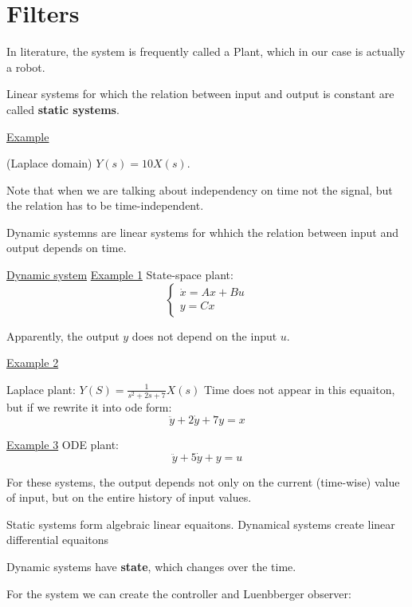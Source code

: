 \section{Filters}

In literature, the system is frequently called a Plant, which in our case is actually a robot. 


\begin{tcolorbox}[colback=green!10,colframe=green!50!black,title=\textbf{Static system}]
    Linear systems for which the relation between input and output is constant are called \textbf{static systems}.
\end{tcolorbox}


\underline{Example}

(Laplace domain) $Y(s) = 10X(s)$. 

Note that when we are talking about independency on time not the signal, but the relation has to be time-independent. 


\begin{tcolorbox}[colback=green!10,colframe=green!50!black,title=\textbf{Dynamic system}]
    Dynamic systemns are linear systems for whhich the relation between input and output depends on time. 
\end{tcolorbox}

\underline{Dynamic system} 
\underline{Example 1}
State-space plant:
\[
\begin{cases}
    \dot x = Ax + Bu \\
    y = Cx 
\end{cases}    
\]

Apparently, the output $y$ does not depend on the input $u$. 

\underline{Example 2}

Laplace plant:
$Y(S) = \frac{1}{s^2 + 2s + 7} X(s)$
Time does not appear in this equaiton, but if we rewrite it into ode form:
\[\ddot y + 2 \dot y + 7 y = x\]

\underline{Example 3}
ODE plant:
\[\ddot y + 5\dot y + y = u\]



For these systems, the output depends not only on the current (time-wise) value of input, but on the entire history of input values.


Static systems form algebraic linear equaitons. Dynamical systems create linear differential equaitons

Dynamic systems have \textbf{state}, which changes over the time. 

For the system we can create the controller and Luenbberger observer:



